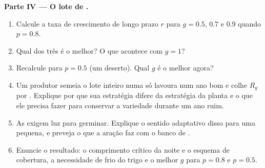 \begin{problem}
\medskip
\noindent\textbf{Parte IV --- O lote de .}
\begin{enumerate}[resume]
  \item Calcule a taxa de crescimento de longo prazo $r$ para $g = 0.5$,
        $0.7$ e $0.9$ quando $p = 0.8$.
  \item Qual dos três é o melhor? O que acontece com $g = 1$?
  \item Recalcule para $p = 0.5$ (um deserto). Qual $g$ é o melhor
        agora?
  \item Um produtor semeia o lote inteiro numa só lavoura num ano bom e
        colhe $R_g$ por . Explique por que sua estratégia difere
        da estratégia da planta e o que ele precisa fazer para conservar
        a variedade durante um ano ruim.
  \item As  exigem luz para germinar. Explique o sentido
        adaptativo disso para uma  pequena, e preveja o que a
        aração faz com o banco de .
  \item Enuncie o resultado: o comprimento crítico da noite e o esquema
        de cobertura, a necessidade de frio do trigo e o melhor $g$ para
        $p = 0.8$ e $p = 0.5$.
\end{enumerate}
\end{problem}
